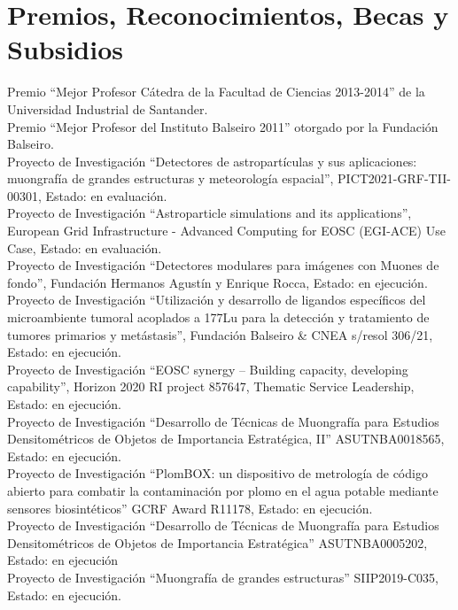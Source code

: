 \section*{Premios, Reconocimientos, Becas y Subsidios}
\noindent
{} Premio ``Mejor Profesor Cátedra de la Facultad de Ciencias 2013-2014'' de la Universidad Industrial de Santander.\\
 Premio ``Mejor Profesor del Instituto Balseiro 2011'' otorgado por la Fundación Balseiro.\\
 Proyecto de Investigación ``Detectores de astropartículas y sus aplicaciones: muongrafía de grandes estructuras y meteorología espacial'', PICT2021-GRF-TII-00301, Estado: en evaluación.\\
 Proyecto de Investigación ``Astroparticle simulations and its applications'', European Grid Infrastructure - Advanced Computing for EOSC (EGI-ACE) Use Case, Estado: en evaluación.\\
 Proyecto de Investigación ``Detectores modulares para imágenes con Muones de fondo'', Fundación Hermanos Agustín y Enrique Rocca, Estado: en ejecución.\\
 Proyecto de Investigación ``Utilización y desarrollo de ligandos específicos del microambiente tumoral acoplados a 177Lu para la detección y tratamiento de tumores primarios y metástasis'', Fundación Balseiro \& CNEA s/resol 306/21, Estado: en ejecución.\\
 Proyecto de Investigación ``EOSC synergy – Building capacity, developing capability'', Horizon 2020 RI project 857647, Thematic Service Leadership, Estado: en ejecución.\\
 Proyecto de Investigación ``Desarrollo de Técnicas de Muongrafía para Estudios Densitométricos de Objetos de Importancia Estratégica, II'' ASUTNBA0018565, Estado: en ejecución.\\
 Proyecto de Investigación ``PlomBOX: un dispositivo de metrología de código abierto para combatir la contaminación por plomo en el agua potable mediante sensores biosintéticos'' GCRF Award R11178, Estado: en ejecución.\\
 Proyecto de Investigación ``Desarrollo de Técnicas de Muongrafía para Estudios Densitométricos de Objetos de Importancia Estratégica'' ASUTNBA0005202, Estado: en ejecución\\
 Proyecto de Investigación ``Muongrafía de grandes estructuras'' SIIP2019-C035, Estado: en ejecución.\\
